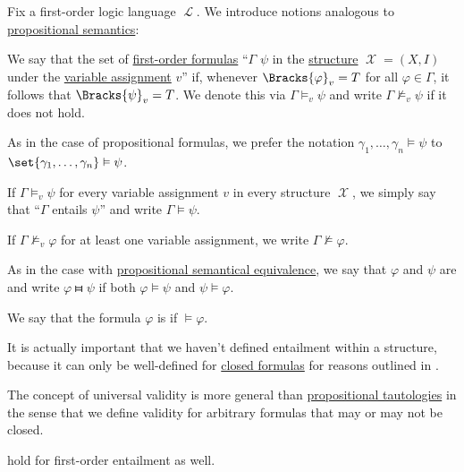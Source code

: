 \begin{definition}\label{def:first_order_semantics}
  Fix a first-order logic language \( \mscrL \). We introduce notions analogous to \hyperref[def:propositional_semantics]{propositional semantics}:
  \begin{thmenum}
     We say that the set of \hyperref[def:first_order_syntax/formula]{first-order formulas} \enquote{\( \Gamma \)  \( \psi \) in the \hyperref[def:first_order_structure]{structure} \( \mscrX = (X, I) \) under the \hyperref[def:first_order_valuation/variable_assignment]{variable assignment} \( v \)} if, whenever \( \Bracks{\varphi}_v = T \) for all \( \varphi \in \Gamma \), it follows that \( \Bracks{\psi}_v = T \). We denote this via \( \Gamma \vDash_v \psi \) and write \( \Gamma \not\vDash_v \psi \) if it does not hold.

    As in the case of propositional formulas, we prefer the notation \( \gamma_1, \ldots, \gamma_n \vDash \psi \) to \( \set{ \gamma_1, \ldots, \gamma_n } \vDash \psi \).

     If \( \Gamma \vDash_v \psi \) for every variable assignment \( v \) in every structure \( \mscrX \), we simply say that \enquote{\( \Gamma \) entails \( \psi \)} and write \( \Gamma \vDash \psi \).

    If \( \Gamma \not\vDash_v \varphi \) for at least one variable assignment, we write \( \Gamma \not\vDash \varphi \).

     As in the case with \hyperref[def:propositional_semantics/equivalence]{propositional semantical equivalence}, we say that \( \varphi \) and \( \psi \) are  and write \( \varphi \gleichstark \psi \) if both \( \varphi \vDash \psi \) and \( \psi \vDash \varphi \).

     We say that the formula \( \varphi \) is  if \( \vDash \varphi \).
  \end{thmenum}
\end{definition}
\begin{comments}
  \item It is actually important that we haven't defined entailment within a structure, because it can only be well-defined for \hyperref[def:first_order_syntax/closed_formula]{closed formulas} for reasons outlined in .

  \item The concept of universal validity is more general than \hyperref[def:propositional_semantics/tautology]{propositional tautologies} in the sense that we define validity for arbitrary formulas that may or may not be closed.

  \item {} hold for first-order entailment as well.
\end{comments}

